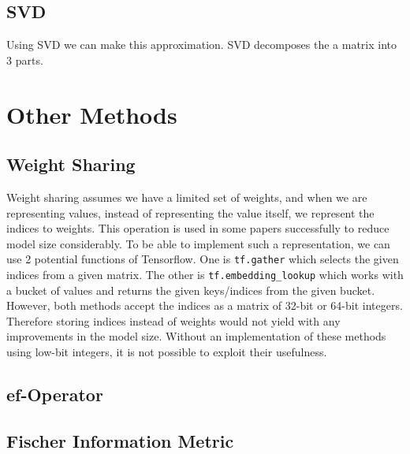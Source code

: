 \subsection{SVD}
Using SVD we can make this approximation. SVD decomposes the a matrix into 3 parts. 
\section{Other Methods}
\subsection{Weight Sharing}
Weight sharing assumes we have a limited set of weights, and when we are representing values, instead of representing the value itself, we represent the indices to weights. This operation is used in some papers successfully to reduce model size considerably. To be able to implement such a representation, we can use 2 potential functions of Tensorflow. One is \texttt{tf.gather} which selects the given indices from a given matrix. The other is \texttt{tf.embedding\_lookup} which works with a bucket of values and returns the given keys/indices from the given bucket. However, both methods accept the indices as a matrix of 32-bit or 64-bit integers. Therefore storing indices instead of weights would not yield with any improvements in the model size. Without an implementation of these methods using low-bit integers, it is not possible to exploit their usefulness.

\subsection{ef-Operator}
\subsection{Fischer Information Metric}






















